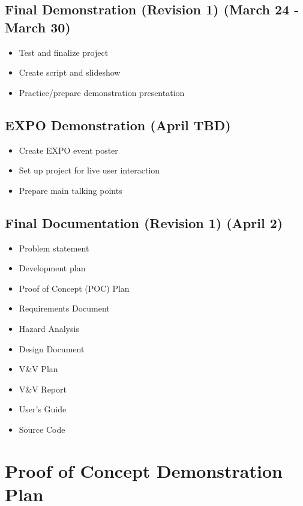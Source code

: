 \documentclass{article}
\begin{document}
	\subsection*{Final Demonstration (Revision 1) (March 24 - March 30)}
	\begin{itemize}
		\item Test and finalize project
		\item Create script and slideshow
		\item Practice/prepare demonstration presentation
	\end{itemize}

	\subsection*{EXPO Demonstration (April TBD)}
	\begin{itemize}
		\item Create EXPO event poster
		\item Set up project for live user interaction
		\item Prepare main talking points
	\end{itemize}

	\subsection*{Final Documentation (Revision 1) (April 2)}
	\begin{itemize}
		\item Problem statement
		\item Development plan
		\item Proof of Concept (POC) Plan
		\item Requirements Document
		\item Hazard Analysis
		\item Design Document
		\item V\&V Plan
		\item V\&V Report
		\item User’s Guide
		\item Source Code
	\end{itemize}

\section{Proof of Concept Demonstration Plan}
\end{document}
